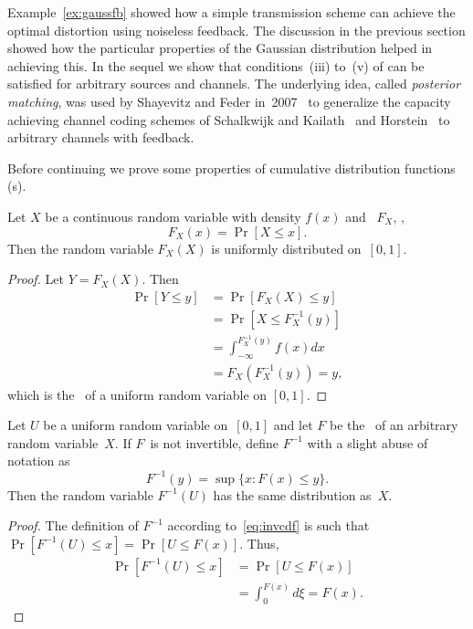 Example~\ref{ex:gaussfb} showed how a simple transmission scheme can achieve the
optimal distortion using noiseless feedback. The discussion in the previous
section showed how the particular properties of the Gaussian distribution helped
in achieving this. In the sequel we show that conditions~(iii) to~(v) of
 can be satisfied for arbitrary sources and channels. The
underlying idea, called \emph{posterior matching}, was used by Shayevitz and
Feder in~2007~\cite{ShayevitzF2007,ShayevitzF2008} to generalize the capacity
achieving channel coding schemes of Schalkwijk and
Kailath~\cite{SchalkwijkK1966} and Horstein~\cite{Horstein1963} to arbitrary
channels with feedback.

Before continuing we prove some properties of cumulative distribution functions
(\cdf s).

\begin{lemma}
  \label{lem:cdfunif}
  Let $X$ be a continuous random variable with density $f(x)$ and \cdf\ $F_X$,
  \ie,
  \begin{equation*}
    F_X(x) = \Pr[X \le x].
  \end{equation*}
  Then the random variable $F_X(X)$ is uniformly distributed on~$[0,1]$.
\end{lemma}

\begin{proof}
  Let $Y = F_X(X)$. Then
  \begin{align*}
    \Pr[Y \le y] &= \Pr[F_X(X) \le y] \\
    &= \Pr[X \le F_X^{-1}(y)] \\
    &= \int_{-\infty}^{F_X^{-1}(y)} f(x) dx \\
    &= F_X(F_X^{-1}(y)) = y,
  \end{align*}
  which is the \cdf\ of a uniform random variable on $[0,1]$.
\end{proof}


\begin{lemma}
  \label{lem:invcdf}
  Let $U$ be a uniform random variable on~$[0,1]$ and let $F$ be the \cdf\ of an
  arbitrary random variable~$X$. If $F$~is not invertible, define $F^{-1}$ with
  a slight abuse of notation as
  \begin{equation}
    \label{eq:invcdf}
    F^{-1}(y) = \sup \{x : F(x) \le y\}.
  \end{equation}
  Then the random variable $F^{-1}(U)$ has the same distribution as~$X$.
\end{lemma}

\begin{proof}
  The definition of $F^{-1}$ according to~\eqref{eq:invcdf} is such
  that $\Pr[F^{-1}(U) \le x] = \Pr[U \le F(x)]$. Thus,
  \begin{align*}
    \Pr[F^{-1}(U) \le x] &= \Pr[U \le F(x)] \\
    &= \int_0^{F(x)} d\xi = F(x).
  \end{align*}
\end{proof}

